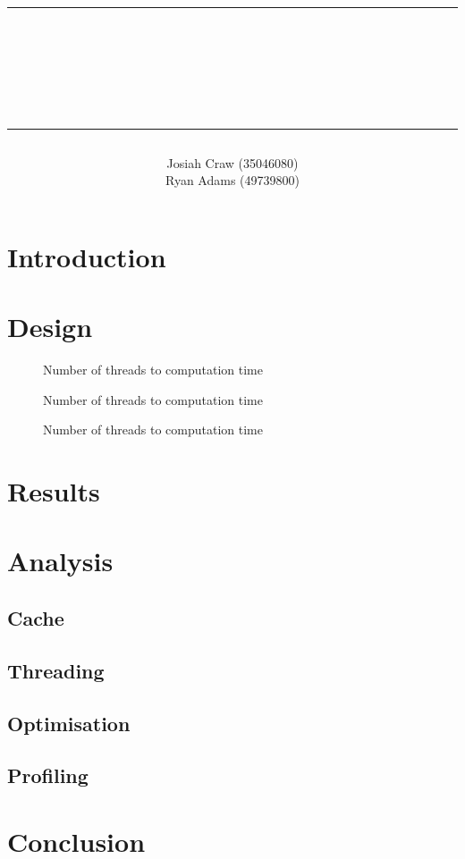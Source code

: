 \documentclass[12pt]{article}
\author{\LARGE Josiah Craw (35046080)\vspace{1cm}\\\LARGE Ryan Adams (49739800)\vspace{1cm}\\}
\title{\rule{\textwidth}{0.8pt} \\ {\huge \textbf{\reportTitle}}\\{\large \subTitle} \rule{\textwidth}{0.8pt}}
\begin{document}
\maketitle
\thispagestyle{empty}
\newpage

\setcounter{page}{1}
\section{Introduction}

\section{Design}

\begin{figure}[H]
    \centering
    
    \caption{Number of threads to computation time}
\end{figure}

\begin{figure}[H]
    \centering
    
    \caption{Number of threads to computation time}
\end{figure}

\begin{figure}[H]
    \centering
    
    \caption{Number of threads to computation time}
\end{figure}

\section{Results}

\section{Analysis}

\subsection{Cache}

\subsection{Threading}

\subsection{Optimisation}

\subsection{Profiling}

\section{Conclusion}

\newpage
\medskip


\end{document}
